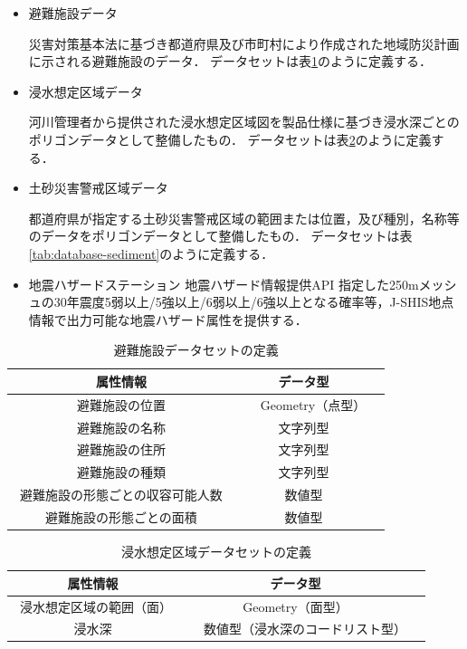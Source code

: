\documentclass[a4paper]{jsarticle}
\begin{document}
\begin{itemize}
  \item 避難施設データ

  災害対策基本法に基づき都道府県及び市町村により作成された地域防災計画に示される避難施設のデータ．
  データセットは表\ref{tab:database-facility}のように定義する．

  \item 浸水想定区域データ

  河川管理者から提供された浸水想定区域図を製品仕様に基づき浸水深ごとのポリゴンデータとして整備したもの．
  データセットは表\ref{tab:database-flood}のように定義する．

  \item 土砂災害警戒区域データ

  都道府県が指定する土砂災害警戒区域の範囲または位置，及び種別，名称等のデータをポリゴンデータとして整備したもの．
  データセットは表\ref{tab:database-sediment}のように定義する．

  \item 地震ハザードステーション 地震ハザード情報提供API
  指定した250mメッシュの30年震度5弱以上/5強以上/6弱以上/6強以上となる確率等，J-SHIS地点情報で出力可能な地震ハザード属性を提供する．

\end{itemize}

\begin{table}[H]
  \begin{center}
    \caption{避難施設データセットの定義}
    \renewcommand\arraystretch{1.4}
    \begin{tabular}{|c|c|c|}
      \hline
      属性情報 & データ型 \\
      \hline
      \hline
      避難施設の位置 & 　Geometry（点型）　 \\
      \hline
      避難施設の名称 & 文字列型 \\
      \hline
      避難施設の住所 & 文字列型 \\
      \hline
      避難施設の種類 & 文字列型 \\
      \hline
      避難施設の形態ごとの収容可能人数　 & 数値型 \\
      \hline
      避難施設の形態ごとの面積 & 数値型  \\
      \hline
    \end{tabular}
    \label{tab:database-facility}
  \end{center}
\end{table}

\begin{table}[H]
  \begin{center}
    \caption{浸水想定区域データセットの定義}
    \renewcommand\arraystretch{1.4}
    \begin{tabular}{|c|c|c|}
      \hline
      属性情報 & データ型 \\
      \hline
      \hline
      浸水想定区域の範囲（面）　 & Geometry（面型） \\
      \hline
      浸水深 & 　数値型（浸水深のコードリスト型）　\\
      \hline
    \end{tabular}
    \label{tab:database-flood}
  \end{center}
\end{table}
\end{document}
